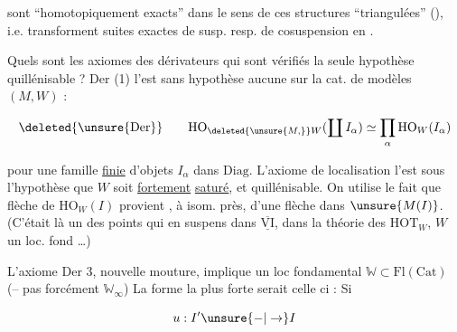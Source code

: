 
sont ``homotopiquement exacts'' dans le sens de ces structures ``triangulées'' (), i.e. transforment suites exactes de susp. resp. de cosuspension en .

Quels sont les axiomes des dérivateurs qui sont vérifiés  la seule hypothèse quillénisable ? $\mathrm{Der}$ (1) l'est sans hypothèse aucune sur la cat. de modèles $(M,W)$ :

\[ \deleted{\unsure{\mathrm{Der}}}\qquad\mathrm{HO}_{\deleted{\unsure{M,}}W}(\coprod I_\alpha)\simeq\prod_\alpha\mathrm{HO}_W(I_\alpha) \]

pour une famille \uline{finie} d'objets $I_\alpha$ dans $\mathrm{Diag}$. L'axiome de localisation  l'est sous l'hypothèse que $W$ soit \uline{fortement} \uline{saturé}, et quillénisable. On utilise le fait que  flèche de $\mathrm{HO}_W(I)$ provient , à isom. près, d'une flèche dans $\unsure{M(I)}$. (C'était là un des points qui  en suspens dans $\overline{\underline{\mathrm{VI}}}$, dans la théorie  des $\mathrm{HOT}_W$, $W$ un loc. fond \ldots)



L'axiome $\mathrm{Der}$ 3, nouvelle mouture, implique un loc fondamental $\mathbb{W}\subset\mathrm{Fl}(\mathrm{Cat})$ (-- pas forcément $\mathbb{W}_\infty$) La forme la plus forte serait celle ci : Si

\[ u:I'\unsure{-|\to}I \]
